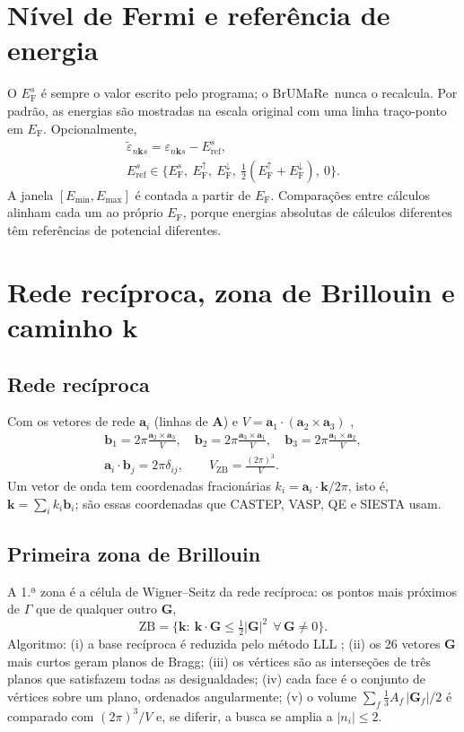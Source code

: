 \documentclass[11pt,a4paper]{article}
\newcommand{\BMR}{\textsf{BrUMa\textcolor[HTML]{B26B00}{Re}}}
\newcommand{\kv}{\mathbf k}\newcommand{\eF}{E_\mathrm{F}}\newcommand{\code}[1]{\texttt{#1}}
\begin{document}
\section{Nível de Fermi e referência de energia}
O $\eF^{s}$ é sempre o valor escrito pelo programa; o \BMR\ nunca o recalcula. Por padrão, as energias são mostradas na escala original com uma linha traço-ponto em $\eF$. Opcionalmente,
\begin{gather}
\tilde\varepsilon_{n\kv s}=\varepsilon_{n\kv s}-E^{s}_\mathrm{ref},\\
E^{s}_\mathrm{ref}\in\{\eF^{s},\ \eF^{\uparrow},\ \eF^{\downarrow},\ \tfrac12(\eF^{\uparrow}+\eF^{\downarrow}),\ 0\}.
\end{gather}
A janela $[E_\mathrm{min},E_\mathrm{max}]$ é contada a partir de $\eF$. Comparações entre cálculos alinham cada um ao próprio $\eF$, porque energias absolutas de cálculos diferentes têm referências de potencial diferentes.

\section{Rede recíproca, zona de Brillouin e caminho $\kv$}
\subsection{Rede recíproca}
Com os vetores de rede $\mathbf a_i$ (linhas de $\mathbf A$) e $V=\mathbf a_1\cdot(\mathbf a_2\times\mathbf a_3)$ \cite{ashcroft1976},
\begin{gather}
\mathbf b_1=2\pi\frac{\mathbf a_2\times\mathbf a_3}{V},\quad \mathbf b_2=2\pi\frac{\mathbf a_3\times\mathbf a_1}{V},\quad \mathbf b_3=2\pi\frac{\mathbf a_1\times\mathbf a_2}{V},\\
\mathbf a_i\cdot\mathbf b_j=2\pi\delta_{ij},\qquad V_\mathrm{ZB}=\frac{(2\pi)^3}{V}.
\end{gather}
Um vetor de onda tem coordenadas fracionárias $k_i=\mathbf a_i\cdot\kv/2\pi$, isto é, $\kv=\sum_ik_i\mathbf b_i$; são essas coordenadas que CASTEP, VASP, QE e SIESTA usam.

\subsection{Primeira zona de Brillouin}
A 1.ª zona é a célula de Wigner--Seitz da rede recíproca: os pontos mais próximos de $\Gamma$ que de qualquer outro $\mathbf G$,
\begin{equation}
\mathrm{ZB}=\{\kv:\ \kv\cdot\mathbf G\le\tfrac12|\mathbf G|^2\ \ \forall\,\mathbf G\neq0\}.
\end{equation}
Algoritmo: (i) a base recíproca é reduzida pelo método LLL \cite{lenstra1982}; (ii) os 26 vetores $\mathbf G$ mais curtos geram planos de Bragg; (iii) os vértices são as interseções de três planos que satisfazem todas as desigualdades; (iv) cada face é o conjunto de vértices sobre um plano, ordenados angularmente; (v) o volume $\sum_f\tfrac13A_f\,|\mathbf G_f|/2$ é comparado com $(2\pi)^3/V$ e, se diferir, a busca se amplia a $|n_i|\le2$.
\end{document}
